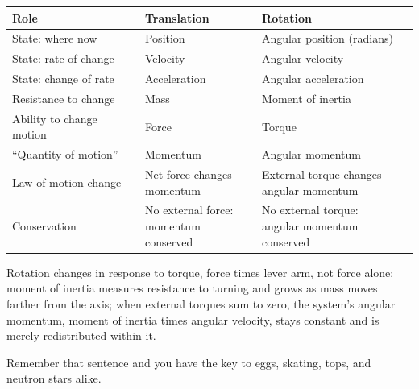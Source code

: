 \begin{center}
\begin{tabular}{lll}
\toprule
\textbf{Role} & \textbf{Translation} & \textbf{Rotation} \\
\midrule
State: where now & Position & Angular position (radians) \\
State: rate of change & Velocity & Angular velocity \\
State: change of rate & Acceleration & Angular acceleration \\
Resistance to change & Mass & Moment of inertia \\
Ability to change motion & Force & Torque \\
``Quantity of motion'' & Momentum & Angular momentum \\
Law of motion change & \shortstack[l]{Net force changes\\momentum} & \shortstack[l]{External torque changes\\angular momentum} \\
Conservation & \shortstack[l]{No external force:\\momentum conserved} & \shortstack[l]{No external torque:\\angular momentum conserved} \\
\bottomrule
\end{tabular}
\end{center}


\begin{oneline}
Rotation changes in response to torque, force times lever arm, not force alone; moment of inertia measures resistance to turning and grows as mass moves farther from the axis; when external torques sum to zero, the system's angular momentum, moment of inertia times angular velocity, stays constant and is merely redistributed within it.
\end{oneline}

Remember that sentence and you have the key to eggs, skating, tops, and neutron stars alike.


